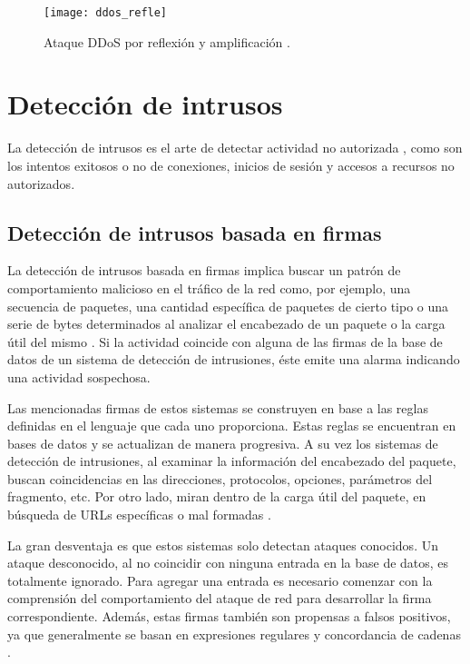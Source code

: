 \begin{figure}[H]
	\centering 
	\texttt{[image: ddos\_refle]}
	\caption[Ataque DDoS por reflexión y amplificación]{Ataque DDoS por reflexión y amplificación \parencite{ddos_amir}.}
	\label{fig:ddos_reflexion}
\end{figure}


\section{Detección de intrusos}

La detección de intrusos es el arte de detectar actividad no autorizada
\parencite{ddos_hh}, como son los intentos exitosos o no de conexiones, inicios
de sesión y accesos a recursos no autorizados.

\subsection{Detección de intrusos basada en firmas}
\label{subsec:deteccion_firmas}
 
La detección de intrusos basada en firmas implica buscar un patrón de
comportamiento malicioso en el tráfico de la red como, por ejemplo, una
secuencia de paquetes, una cantidad específica de paquetes de cierto tipo o una
serie de bytes determinados al analizar el encabezado de un paquete o la carga
útil del mismo \parencite{ids_snort}. Si la actividad coincide con alguna de las
firmas de la base de datos de un sistema de detección de intrusiones, éste emite
una alarma indicando una actividad sospechosa.

Las mencionadas firmas de estos sistemas se construyen en base a las reglas
definidas en el lenguaje que cada uno proporciona. Estas reglas se encuentran en
bases de datos y se actualizan de manera progresiva. A su vez los sistemas de
detección de intrusiones, al examinar la información del encabezado del paquete,
buscan coincidencias en las direcciones, protocolos, opciones, parámetros del
fragmento, etc. Por otro lado, miran dentro de la carga útil del paquete, en
búsqueda de URLs específicas o mal formadas \parencite{ids_signatures}.

La gran desventaja es que estos sistemas solo detectan ataques conocidos. Un
ataque desconocido, al no coincidir con ninguna entrada en la base de datos, es
totalmente ignorado. Para agregar una entrada es necesario comenzar con la
comprensión del comportamiento del ataque de red para desarrollar la firma
correspondiente. Además, estas firmas también son propensas a falsos positivos,
ya que generalmente se basan en expresiones regulares y concordancia de cadenas
\parencite{ddos_foster}.


